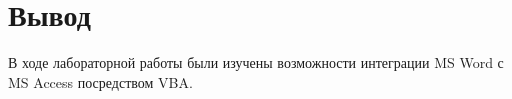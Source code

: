 \section{Вывод}

В ходе лабораторной работы были изучены возможности интеграции MS Word с MS Access посредством VBA.

\clearpage
